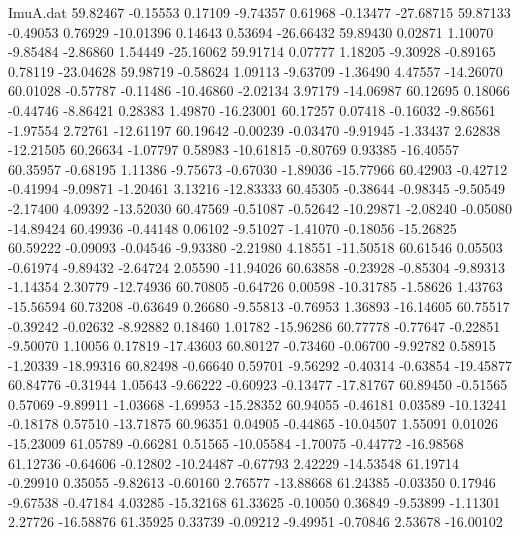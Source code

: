 \begin{filecontents}{ImuA.dat}
  59.82467   -0.15553    0.17109   -9.74357    0.61968   -0.13477  -27.68715
  59.87133   -0.49053    0.76929  -10.01396    0.14643    0.53694  -26.66432
  59.89430    0.02871    1.10070   -9.85484   -2.86860    1.54449  -25.16062
  59.91714    0.07777    1.18205   -9.30928   -0.89165    0.78119  -23.04628
  59.98719   -0.58624    1.09113   -9.63709   -1.36490    4.47557  -14.26070
  60.01028   -0.57787   -0.11486  -10.46860   -2.02134    3.97179  -14.06987
  60.12695    0.18066   -0.44746   -8.86421    0.28383    1.49870  -16.23001
  60.17257    0.07418   -0.16032   -9.86561   -1.97554    2.72761  -12.61197
  60.19642   -0.00239   -0.03470   -9.91945   -1.33437    2.62838  -12.21505
  60.26634   -1.07797    0.58983  -10.61815   -0.80769    0.93385  -16.40557
  60.35957   -0.68195    1.11386   -9.75673   -0.67030   -1.89036  -15.77966
  60.42903   -0.42712   -0.41994   -9.09871   -1.20461    3.13216  -12.83333
  60.45305   -0.38644   -0.98345   -9.50549   -2.17400    4.09392  -13.52030
  60.47569   -0.51087   -0.52642  -10.29871   -2.08240   -0.05080  -14.89424
  60.49936   -0.44148    0.06102   -9.51027   -1.41070   -0.18056  -15.26825
  60.59222   -0.09093   -0.04546   -9.93380   -2.21980    4.18551  -11.50518
  60.61546    0.05503   -0.61974   -9.89432   -2.64724    2.05590  -11.94026
  60.63858   -0.23928   -0.85304   -9.89313   -1.14354    2.30779  -12.74936
  60.70805   -0.64726    0.00598  -10.31785   -1.58626    1.43763  -15.56594
  60.73208   -0.63649    0.26680   -9.55813   -0.76953    1.36893  -16.14605
  60.75517   -0.39242   -0.02632   -8.92882    0.18460    1.01782  -15.96286
  60.77778   -0.77647   -0.22851   -9.50070    1.10056    0.17819  -17.43603
  60.80127   -0.73460   -0.06700   -9.92782    0.58915   -1.20339  -18.99316
  60.82498   -0.66640    0.59701   -9.56292   -0.40314   -0.63854  -19.45877
  60.84776   -0.31944    1.05643   -9.66222   -0.60923   -0.13477  -17.81767
  60.89450   -0.51565    0.57069   -9.89911   -1.03668   -1.69953  -15.28352
  60.94055   -0.46181    0.03589  -10.13241   -0.18178    0.57510  -13.71875
  60.96351    0.04905   -0.44865  -10.04507    1.55091    0.01026  -15.23009
  61.05789   -0.66281    0.51565  -10.05584   -1.70075   -0.44772  -16.98568
  61.12736   -0.64606   -0.12802  -10.24487   -0.67793    2.42229  -14.53548
  61.19714   -0.29910    0.35055   -9.82613   -0.60160    2.76577  -13.88668
  61.24385   -0.03350    0.17946   -9.67538   -0.47184    4.03285  -15.32168
  61.33625   -0.10050    0.36849   -9.53899   -1.11301    2.27726  -16.58876
  61.35925    0.33739   -0.09212   -9.49951   -0.70846    2.53678  -16.00102

\end{filecontents}
